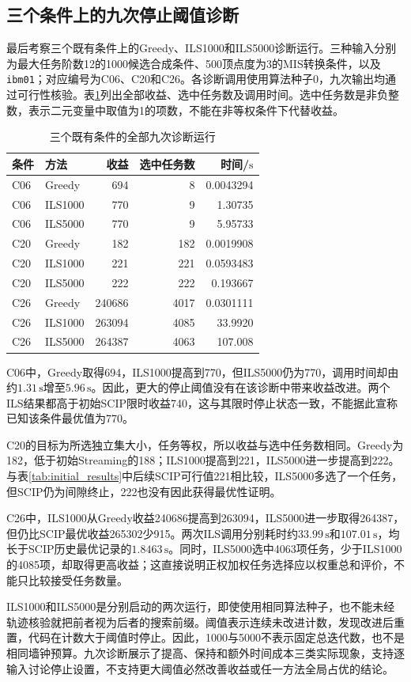 \subsection{三个条件上的九次停止阈值诊断}

最后考察三个既有条件上的Greedy、ILS1000和ILS5000诊断运行。三种输入分别为最大任务阶数12的1000候选合成条件、500顶点度为3的MIS转换条件，以及\texttt{ibm01}；对应编号为C06、C20和C26。各诊断调用使用算法种子0，九次输出均通过可行性核验。表\ref{s0307:tab_diagnostic}列出全部收益、选中任务数及调用时间。选中任务数是非负整数，表示二元变量中取值为1的项数，不能在非等权条件下代替收益。

\begin{table}[tbp]
 \centering
 \small
 \caption{三个既有条件的全部九次诊断运行}
 \label{s0307:tab_diagnostic}
 \begin{tabular}{llrrr}
 \toprule
 条件 & 方法 & 收益 & 选中任务数 & 时间/$\mathrm{s}$\\
 \midrule
 C06 & Greedy  & 694    & 8    & 0.0043294\\
 C06 & ILS1000 & 770    & 9    & 1.30735\\
 C06 & ILS5000 & 770    & 9    & 5.95733\\
 C20 & Greedy  & 182    & 182  & 0.0019908\\
 C20 & ILS1000 & 221    & 221  & 0.0593483\\
 C20 & ILS5000 & 222    & 222  & 0.193667\\
 C26 & Greedy  & 240686 & 4017 & 0.0301111\\
 C26 & ILS1000 & 263094 & 4085 & 33.9920\\
 C26 & ILS5000 & 264387 & 4063 & 107.008\\
 \bottomrule
 \end{tabular}
\end{table}

C06中，Greedy取得694，ILS1000提高到770，但ILS5000仍为770，调用时间却由约$1.31\,\mathrm{s}$增至$5.96\,\mathrm{s}$。因此，更大的停止阈值没有在该诊断中带来收益改进。两个ILS结果都高于初始SCIP限时收益740，这与其限时停止状态一致，不能据此宣称已知该条件最优值为770。

C20的目标为所选独立集大小，任务等权，所以收益与选中任务数相同。Greedy为182，低于初始Streaming的188；ILS1000提高到221，ILS5000进一步提高到222。与表\ref{tab:initial_results}中后续SCIP可行值221相比较，ILS5000多选了一个任务，但SCIP仍为间隙终止，222也没有因此获得最优性证明。

C26中，ILS1000从Greedy收益240686提高到263094，ILS5000进一步取得264387，但仍比SCIP最优收益265302少915。两次ILS调用分别耗时约$33.99\,\mathrm{s}$和$107.01\,\mathrm{s}$，均长于SCIP历史最优记录的$1.8463\,\mathrm{s}$。同时，ILS5000选中4063项任务，少于ILS1000的4085项，却取得更高收益；这直接说明正权加权任务选择应以权重总和评价，不能只比较接受任务数量。

ILS1000和ILS5000是分别启动的两次运行，即使使用相同算法种子，也不能未经轨迹核验就把前者视为后者的搜索前缀。阈值表示连续未改进计数，发现改进后重置，代码在计数大于阈值时停止\cite{GrossmannJRS2026}。因此，1000与5000不表示固定总迭代数，也不是相同墙钟预算。九次诊断展示了提高、保持和额外时间成本三类实际现象，支持逐输入讨论停止设置，不支持更大阈值必然改善收益或任一方法全局占优的结论。
